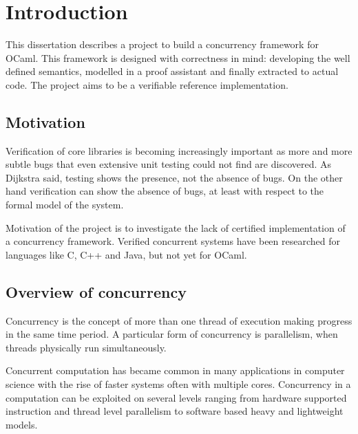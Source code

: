 \documentclass[12pt,twoside,notitlepage]{report}
\theoremstyle{plain}%
\theoremstyle{definition}
\theoremstyle{remark}
\begin{document}

\cleardoublepage        %

\setcounter{page}{1}
\pagestyle{headings}
\chapter{Introduction}

This dissertation describes a project to build a concurrency framework for OCaml. This framework is designed with correctness in mind: developing the well defined semantics, modelled in a proof assistant and finally extracted to actual code. The project aims to be a verifiable reference implementation. 

\section{Motivation}
Verification of core libraries is becoming increasingly important as more and more subtle bugs that even extensive unit testing could not find are discovered. As Dijkstra said, testing shows the presence, not the absence of bugs. On the other hand verification can show the absence of bugs, at least with respect to the formal model of the system.

Motivation of the project is to investigate the lack of certified implementation of a concurrency framework. Verified concurrent systems have been researched for languages like C\cite{sevvcik2011relaxed}, C++ and Java\cite{lochbihler2012machine}, but not yet for OCaml. 

\section{Overview of concurrency}
Concurrency is the concept of more than one thread of execution making progress in the same time period. A particular form of concurrency is parallelism, when threads physically run simultaneously.

Concurrent computation has became common in many applications in computer science with the rise of faster systems often with multiple cores. Concurrency in a computation can be exploited on several levels ranging from hardware supported instruction and thread level parallelism to software based heavy and lightweight models. 
\end{document}
